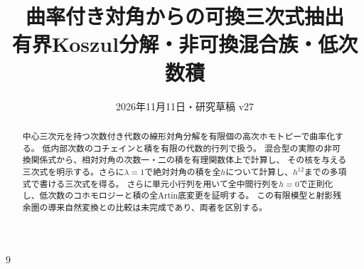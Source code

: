 \documentclass[a4paper,11pt]{ltjsarticle}
\title{曲率付き対角からの可換三次式抽出\\
\large 有界Koszul分解・非可換混合族・低次数積}
\author{}
\date{2026年11月11日・研究草稿 v27}
\theoremstyle{definition}
\begin{document}
\maketitle
\begin{abstract}
中心三次元を持つ次数付き代数の線形対角分解を有限個の高次ホモトピーで曲率化する。
低内部次数のコチェインと積を有限の代数的行列で扱う。
混合型の実際の非可換関係式から、相対対角の次数一・二の積を有理関数体上で計算し、
その核を与える三次式を明示する。さらに$\lambda=1$で絶対対角の積を全$h$について計算し、$h^{12}$までの多項式で書ける三次式を得る。
さらに単元小行列を用いて全中間行列を$h=0$で正則化し、低次数のコホモロジーと積の全Artin底変更を証明する。
この有限模型と射影残余圏の導来自然変換との比較は未完成であり、両者を区別する。
\end{abstract}
\tableofcontents


\begin{thebibliography}{9}


\end{thebibliography}
\end{document}
